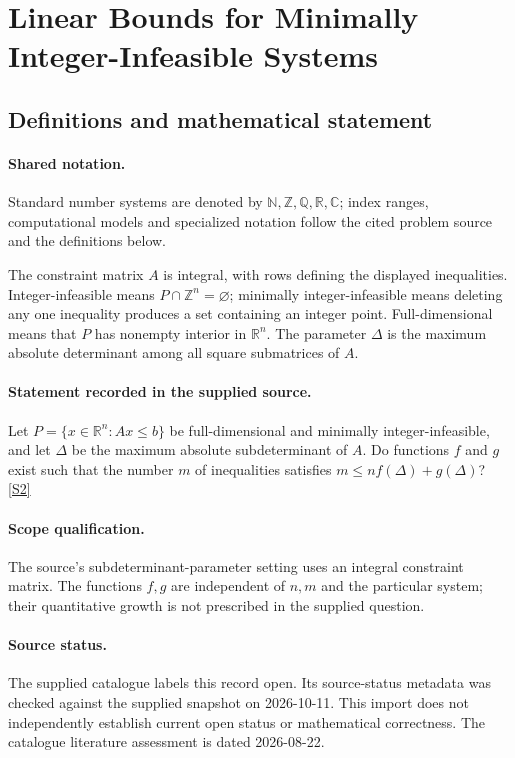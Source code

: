 \documentclass[11pt]{article}
\newcommand{\sref}[2]{\hyperlink{source:#1:#2}{[S#2]}}
\begin{document}
\section{Linear Bounds for Minimally Integer-Infeasible Systems}\label{statement}

\subsection{Definitions and mathematical statement}

\paragraph{Shared notation.}Standard number systems are denoted by $\mathbb N,\mathbb Z,\mathbb Q,\mathbb R,\mathbb C$; index ranges, computational models and specialized notation follow the cited problem source and the definitions below.


The constraint matrix $A$ is integral, with rows defining the displayed inequalities. Integer-infeasible means $P\cap\mathbb Z^n=\varnothing$; minimally integer-infeasible means deleting any one inequality produces a set containing an integer point. Full-dimensional means that $P$ has nonempty interior in $\mathbb R^n$. The parameter $\Delta$ is the maximum absolute determinant among all square submatrices of $A$.
\paragraph{Statement recorded in the supplied source.}
Let $P=\{x\in\mathbb R^n:Ax\leq b\}$ be full-dimensional and minimally integer-infeasible, and let $\Delta$ be the maximum absolute subdeterminant of $A$. Do functions $f$ and $g$ exist such that the number $m$ of inequalities satisfies $m\leq nf(\Delta)+g(\Delta)$? \sref{statement}{2}
\paragraph{Scope qualification.}
The source's subdeterminant-parameter setting uses an integral constraint matrix. The functions $f,g$ are independent of $n,m$ and the particular system; their quantitative growth is not prescribed in the supplied question.
\paragraph{Source status.}
The supplied catalogue labels this record open. Its source-status metadata was checked against the supplied snapshot on 2026-10-11. This import does not independently establish current open status or mathematical correctness. The catalogue literature assessment is dated 2026-08-22.
\end{document}
